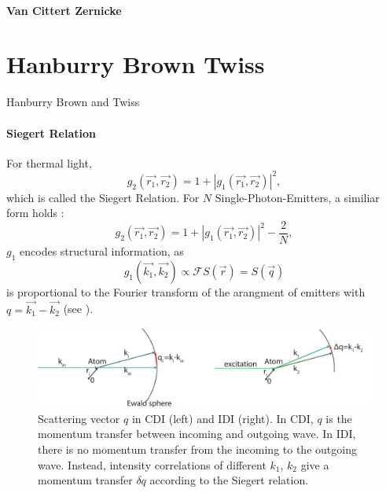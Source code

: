 \paragraph{Van Cittert Zernicke}

\section{Hanburry Brown Twiss}
Hanburry Brown and Twiss 


\paragraph{Siegert Relation}
For thermal light, 
\begin{equation}
	g_2(\vec{r_1},\vec{r_2}) = 1+ |g_1(\vec{r_1},\vec{r_2}) |^2 ,
\end{equation}
which is called the Siegert Relation.
For $N$ Single-Photon-Emitters, a similiar form holds \cite{classen2017}:
\begin{equation}
	g_2(\vec{r_1},\vec{r_2}) = 1+ |g_1(\vec{r_1},\vec{r_2}) |^2 - \frac{2}{N} ,
\end{equation}
$g_1$ encodes structural information, as 
\begin{equation}
g_1(\vec{k_1},\vec{k_2}) \propto \mathscr{F}S(\vec{r}) = S(\vec{q})
\end{equation}
is proportional to the Fourier transform of the arangment of emitters with $q=\vec{k_1}-\vec{k_2}$ (see ).
 \begin{figure}
	\centering
	\includegraphics[width=0.9\linewidth]{images/scatteringvectors.pdf}
	\caption[Scattering Vectors]{Scattering vector $q$ in CDI (left) and IDI (right). In CDI, $q$ is the momentum transfer between incoming and outgoing wave. In IDI, there is no momentum transfer from the incoming to the outgoing wave. Instead, intensity correlations of different $k_1$, $k_2$ give a momentum transfer $\delta q$ according to the Siegert relation.}
	\label{fig:scatteringvectors}
	
\end{figure}


